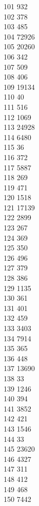 { 101	932 \\
 102	378 \\
 103	485 \\
 104	72926 \\
 105	20260 \\
 106	342 \\
 107	509 \\
 108	406 \\
 109	19134 \\
 110	40 \\
 111	516 \\
 112	1069 \\
 113	24928 \\
 114	6480 \\
 115	36 \\
 116	372 \\
 117	5887 \\
 118	269 \\
 119	471 \\
 120	1518 \\
 121	17139 \\
 122	2899 \\
 123	267 \\
 124	369 \\
 125	350 \\
 126	496 \\
 127	379 \\
 128	386 \\
 129	1135 \\
 130	361 \\
 131	401 \\
 132	459 \\
 133	3403 \\
 134	7914 \\
 135	365 \\
 136	448 \\
 137	13690 \\
 138	33 \\
 139	1246 \\
 140	394 \\
 141	3852 \\
 142	421 \\
 143	1546 \\
 144	33 \\
 145	23620 \\
 146	4327 \\
 147	311 \\
 148	412 \\
 149	468 \\
 150	7442 \\
}
